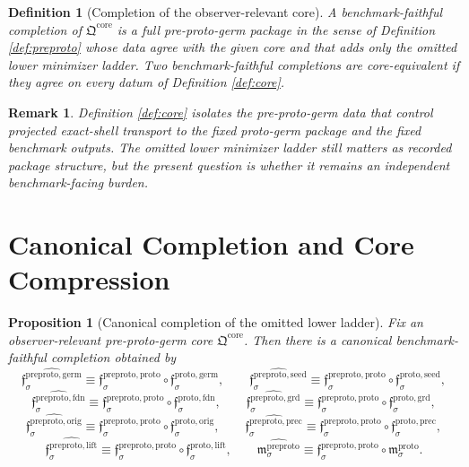 \documentclass[11pt]{article}
\newcommand{\ProtoGermMin}[1]{\mathfrak f_{#1}^{\mathrm{proto,germ}}}
\newcommand{\ProtoSeedMin}[1]{\mathfrak f_{#1}^{\mathrm{proto,seed}}}
\newcommand{\ProtoFoundMin}[1]{\mathfrak f_{#1}^{\mathrm{proto,fdn}}}
\newcommand{\ProtoGroundMin}[1]{\mathfrak f_{#1}^{\mathrm{proto,grd}}}
\newcommand{\ProtoOrigMin}[1]{\mathfrak f_{#1}^{\mathrm{proto,orig}}}
\newcommand{\ProtoPrecMin}[1]{\mathfrak f_{#1}^{\mathrm{proto,prec}}}
\newcommand{\ProtoLiftMin}[1]{\mathfrak f_{#1}^{\mathrm{proto,lift}}}
\newcommand{\ProtoSubMin}[1]{\mathfrak m_{#1}^{\mathrm{proto}}}
\newcommand{\PreProtoCore}{\mathfrak Q^{\mathrm{core}}}
\newcommand{\PreProtoProtoMin}[1]{\mathfrak f_{#1}^{\mathrm{preproto,proto}}}
\newcommand{\PreProtoGermMin}[1]{\mathfrak f_{#1}^{\mathrm{preproto,germ}}}
\newcommand{\PreProtoSeedMin}[1]{\mathfrak f_{#1}^{\mathrm{preproto,seed}}}
\newcommand{\PreProtoFoundMin}[1]{\mathfrak f_{#1}^{\mathrm{preproto,fdn}}}
\newcommand{\PreProtoGroundMin}[1]{\mathfrak f_{#1}^{\mathrm{preproto,grd}}}
\newcommand{\PreProtoOrigMin}[1]{\mathfrak f_{#1}^{\mathrm{preproto,orig}}}
\newcommand{\PreProtoPrecMin}[1]{\mathfrak f_{#1}^{\mathrm{preproto,prec}}}
\newcommand{\PreProtoLiftMin}[1]{\mathfrak f_{#1}^{\mathrm{preproto,lift}}}
\newcommand{\PreProtoSubMin}[1]{\mathfrak m_{#1}^{\mathrm{preproto}}}
\newtheorem{definition}{Definition}
\newtheorem{proposition}{Proposition}
\newtheorem{remark}{Remark}
\begin{document}
\begin{definition}[Completion of the observer-relevant core]
\label{def:completion}
A \emph{benchmark-faithful completion} of \(\PreProtoCore\) is a full pre-proto-germ package in the sense of Definition \ref{def:preproto} whose data agree with the given core and that adds only the omitted lower minimizer ladder. Two benchmark-faithful completions are \emph{core-equivalent} if they agree on every datum of Definition \ref{def:core}.
\end{definition}

\begin{remark}
Definition \ref{def:core} isolates the pre-proto-germ data that control projected exact-shell transport to the fixed proto-germ package and the fixed benchmark outputs. The omitted lower minimizer ladder still matters as recorded package structure, but the present question is whether it remains an independent benchmark-facing burden.
\end{remark}

\section{Canonical Completion and Core Compression}

\begin{proposition}[Canonical completion of the omitted lower ladder]
\label{prop:canonical}
Fix an observer-relevant pre-proto-germ core \(\PreProtoCore\). Then there is a canonical benchmark-faithful completion obtained by
\[
\widehat{\PreProtoGermMin{\sigma}}
\equiv
\PreProtoProtoMin{\sigma}\circ\ProtoGermMin{\sigma},
\qquad
\widehat{\PreProtoSeedMin{\sigma}}
\equiv
\PreProtoProtoMin{\sigma}\circ\ProtoSeedMin{\sigma},
\]
\[
\widehat{\PreProtoFoundMin{\sigma}}
\equiv
\PreProtoProtoMin{\sigma}\circ\ProtoFoundMin{\sigma},
\qquad
\widehat{\PreProtoGroundMin{\sigma}}
\equiv
\PreProtoProtoMin{\sigma}\circ\ProtoGroundMin{\sigma},
\]
\[
\widehat{\PreProtoOrigMin{\sigma}}
\equiv
\PreProtoProtoMin{\sigma}\circ\ProtoOrigMin{\sigma},
\qquad
\widehat{\PreProtoPrecMin{\sigma}}
\equiv
\PreProtoProtoMin{\sigma}\circ\ProtoPrecMin{\sigma},
\]
\[
\widehat{\PreProtoLiftMin{\sigma}}
\equiv
\PreProtoProtoMin{\sigma}\circ\ProtoLiftMin{\sigma},
\qquad
\widehat{\PreProtoSubMin{\sigma}}
\equiv
\PreProtoProtoMin{\sigma}\circ\ProtoSubMin{\sigma}.
\]
\end{proposition}
\end{document}
